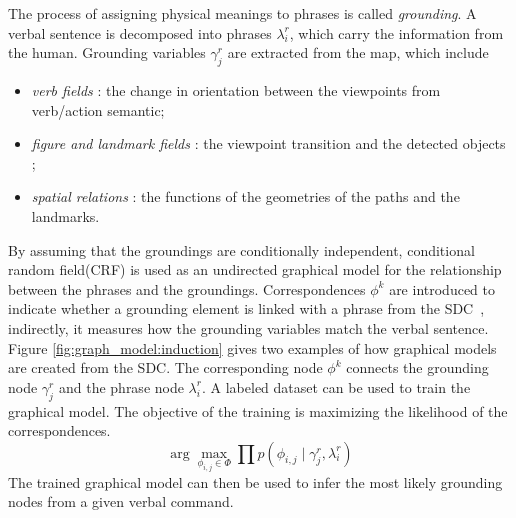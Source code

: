 \documentclass[phd]{byuprop}
\begin{document}
The process of assigning physical meanings to phrases is called {\em grounding}.
A verbal sentence is decomposed into phrases $ \lambda^{r}_{i} $, which carry the information from the human.
Grounding variables $ \gamma^{r}_{j} $ are extracted from the map, which include
\begin{itemize}
\item {\em verb fields} : the change in orientation between the viewpoints from verb/action semantic;
\item {\em figure and landmark fields} : the viewpoint transition and the detected objects ;
\item {\em spatial relations} : the functions of the geometries of the paths and the landmarks.
\end{itemize}
By assuming that the groundings are conditionally independent, conditional random field(CRF) is used as an undirected graphical model for the relationship between the phrases and the groundings.
Correspondences $ \phi^{k} $ are introduced to indicate whether a grounding element is linked with a phrase from the SDC~\cite{tellex2011understanding},
indirectly, it measures how the grounding variables match the verbal sentence.
Figure \ref{fig:graph_model:induction} gives two examples of how graphical models are created from the SDC.
The corresponding node $ \phi^{k} $ connects the grounding node $ \gamma^{r}_{j} $ and the phrase node $ \lambda^{r}_{i} $.
A labeled dataset can be used to train the graphical model.
The objective of the training is maximizing the likelihood of the correspondences.
\begin{equation}
\arg \max_{\phi_{i,j} \in \Phi } \prod p( \phi_{i,j} \mid \gamma^{r}_{j} , \lambda^{r}_{i} )
\end{equation}
The trained graphical model can then be used to infer the most likely grounding nodes from a given verbal command.
\end{document}
